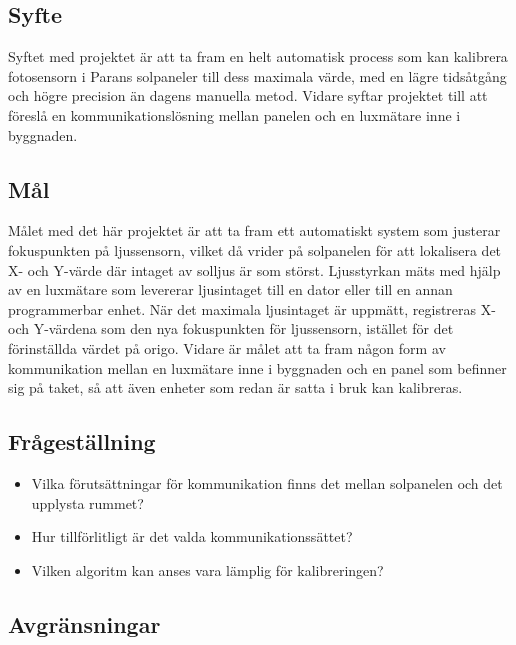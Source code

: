    \subsection{Syfte} %
    \label{sub:syfte}
          Syftet med projektet är att ta fram en helt automatisk process som kan kalibrera fotosensorn i Parans solpaneler till dess maximala värde, med en lägre tidsåtgång och högre precision än dagens manuella metod. 
          Vidare syftar projektet till att föreslå en kommunikationslösning mellan panelen och en lux\-mätare inne i byggnaden.

    \subsection{Mål} %
    \label{sub:mal}
        Målet med det här projektet är att ta fram ett automatiskt system som justerar fokuspunkten på ljussensorn, vilket då vrider på solpanelen för att lokalisera det X- och Y-värde där intaget av solljus är som störst. 
        Ljusstyrkan mäts med hjälp av en luxmätare som levererar ljusintaget till en dator eller till en annan programmerbar enhet. 
        När det maximala ljusintaget är uppmätt, registreras X- och Y-värdena som den nya fokuspunkten för ljussensorn, istället för det förinställda värdet på origo. 
        Vidare är målet att ta fram någon form av kommunikation mellan en luxmätare inne i byggnaden och en panel som befinner sig på taket, så att även enheter som redan är satta i bruk kan kalibreras. 


    \subsection{Frågeställning} %
    \label{sub:fragestallning}
        \begin{itemize}
            \item Vilka förutsättningar för kommunikation finns det mellan solpanelen och det upplysta rummet? \\
            \item Hur tillförlitligt är det valda kommunikationssättet? \\
            \item Vilken algoritm kan anses vara lämplig för kalibreringen?
        \end{itemize}

    \subsection{Avgränsningar} %
    \label{sub:avgr_nsningar}
